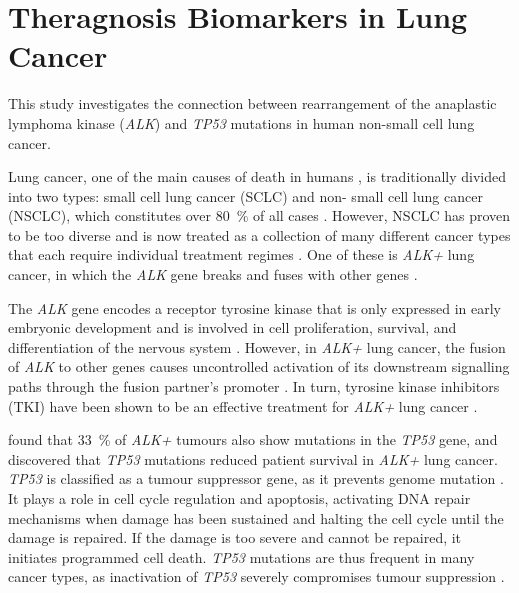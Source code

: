 
\chapter{Theragnosis Biomarkers in Lung Cancer}

This study investigates the connection between rearrangement of the anaplastic
lymphoma kinase (\textit{ALK}) and \textit{TP53} mutations in human non-small
cell lung cancer.

Lung cancer, one of the main causes of death in humans \citep{Siegel2018}, is
traditionally divided into two types: small cell lung cancer (SCLC) and non-%
small cell lung cancer (NSCLC), which constitutes over \SI{80}{\percent} of
all cases \citep{Reck2014}. However, NSCLC has proven to be too diverse and is
now treated as a collection of many different cancer types that each require
individual treatment regimes \citep{Boolell2015}. One of these is \textit{ALK+}
lung cancer, in which the \textit{ALK} gene breaks and fuses with other genes
\citep{Holla2017}.

The \textit{ALK} gene encodes a receptor tyrosine kinase that is only expressed
in early embryonic development and is involved in cell proliferation, survival,
and differentiation of the nervous system \citep{Iwahara1997}.
However, in \textit{ALK+} lung cancer, the fusion of \textit{ALK} to other genes
causes uncontrolled activation of its downstream signalling paths through the
fusion partner's promoter \citep{Holla2017}. In turn, tyrosine kinase inhibitors
(TKI) have been shown to be an effective treatment for \textit{ALK+} lung cancer
\citep{Kwak2010,Reck2014}.

\citet{Gainor2016} found that \SI{33}{\percent} of \textit{ALK+} tumours also
show mutations in the \textit{TP53} gene, and \citet{Aisner2018} discovered
that \textit{TP53} mutations reduced patient survival in \textit{ALK+} lung
cancer. \textit{TP53} is classified as a tumour suppressor gene, as it
prevents genome mutation \citep{Surget2013}. It plays a role in cell cycle
regulation and apoptosis, activating DNA repair mechanisms when damage has
been sustained and halting the cell cycle until the damage is repaired. If the
damage is too severe and cannot be repaired, it initiates programmed cell
death. \textit{TP53} mutations are thus frequent in many cancer types, as
inactivation of \textit{TP53} severely compromises tumour suppression \citep{%
Olivier2010}.

